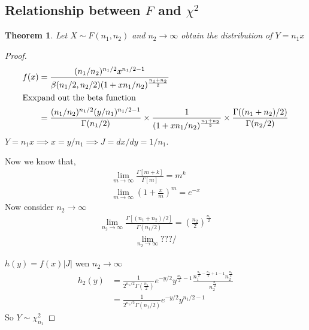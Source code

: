 \documentclass[oneside,11pt,pdftex]{book}%
\numberwithin{equation}{section}
\newtheorem{theorem}{Theorem}[chapter]%
\numberwithin{section}{chapter}
\numberwithin{equation}{chapter}
\begin{document}
\subsection{Relationship between $ F $ and $ \chi^2 $}
\begin{theorem}
	Let $ X \sim F(n_1,n_2) $ and $ n_2\rightarrow \infty $ obtain the distribution of $ Y=n_1x $
\end{theorem}
\begin{proof}
	\begin{align*}
		f(x)&=\frac{(n_1/n_2)^{n_1/2}x^{n_1/2-1}}{\beta(n_1/2,n_2/2)(1+xn_1/n_2)^{\frac{n_1+n_2}{2}}}\\
		\intertext{Exxpand out the beta function}
		&=\frac{(n_1/n_2)^{n_1/2}(y/n_1)^{n_1/2-1}}{\Gamma(n_1/2)}\times \frac{1}{(1+xn_1/n_2)^{\frac{n_1+n_2}{2}}}\times \frac{\Gamma((n_1+n_2)/2)}{\Gamma(n_2/2)}\\
	\end{align*}
$ Y=n_1x\implies x=y/n_1 \implies J=dx/dy=1/n_1 $. 

Now we know that,
\begin{align*}
	\lim_{m \rightarrow \infty} \frac{\Gamma[m+k]}{\Gamma[m]}=m^k\\
	\lim_{m\rightarrow \infty} \left(1+\frac{x}{m}\right)^m=e^{-x}
\end{align*}
Now consider $ n_2\rightarrow \infty $
\begin{align*}
	\lim_{n_2 \rightarrow \infty} \frac{\Gamma[(n_1+n_2)/2]}{\Gamma(n_1/2)}=\left( \frac{n_2}{2} \right)^\frac{n_1}{2}
\end{align*}
\begin{align*}
	\lim_{n_2 \rightarrow \infty} ???/
\end{align*}

$ h(y)=f(x) |J|$ wen $ n_2\rightarrow \infty $
\begin{align*}
	h_2(y)&=\frac{1}{2^{n_1/2}\Gamma \left(\frac{n_1}{2}\right)}e^{-y/2}y^{\frac{n_1}{2}-1}\frac{n_1^{\frac{n_1}{2}-\frac{n_1}{2}+1-1}n_2^{\frac{n_1}{2}}}{n_2^{\frac{n_1}{2}}}\\
	&=\frac{1}{2^{n_1/2}\Gamma(n_1/2)}e^{-y/2}y^{n_1/2-1}
\end{align*}
So $ Y \sim \chi^2_{n_1} $
\end{proof}
\backmatter


\thispagestyle{empty}%
{\ }
\newpage
\end{document}

